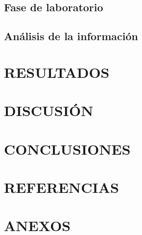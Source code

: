 \documentclass[10pt]{report}
\begin{document}
\section{Fase de laboratorio}

\section{Análisis de la información}

\chapter{RESULTADOS}

\chapter{DISCUSIÓN}

\chapter{CONCLUSIONES}

\chapter{REFERENCIAS}

\printbibliography[title={REFERENCIAS}, heading=bibnumbered]

\chapter{ANEXOS}
\end{document}

